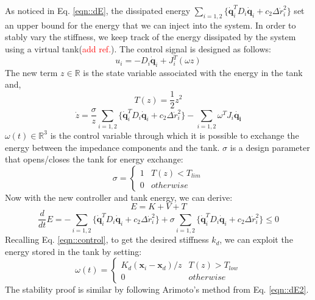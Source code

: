 \documentclass[]{article}
\begin{document}
As noticed in Eq. \ref{eqn::dE}, the dissipated energy $\sum\limits_{i=1,2}\{\mathbf{\dot{q}}_i^TD_i\mathbf{\dot{q}}_i+c_2\Delta \dot{r}_i^2\}$ set an upper bound for the energy that we can inject into the system. In order to stably vary the stiffness, we keep track of the energy dissipated by the system using a virtual tank(\textcolor{red}{add ref.}). The control signal is designed as follows:
\begin{equation}
u_i=-D_i\mathbf{\dot{q}}_i+J_i^T(\omega z)
\label{eqn::new_control}
\end{equation} 
The new term $z\in \mathbb{R}$ is the state variable associated with the energy in the tank and,
\begin{equation}
T(z)=\frac{1}{2}z^2
\end{equation}
\begin{equation}
\dot{z}=\frac{\sigma}{z}\sum\limits_{i=1,2}\{\mathbf{\dot{q}}_i^TD_i\mathbf{\dot{q}}_i+c_2\Delta \dot{r}_i^2\}-\sum\limits_{i=1,2}\omega^T J_i\mathbf{\dot{q_i}}
\end{equation}
$\omega(t)\in \mathbb{R}^3$ is the control variable through which it is possible to exchange the energy between the impedance components and the tank. $\sigma$ is a design parameter that opens/closes the tank for energy exchange:
\begin{displaymath}
\sigma = \left\{\begin{array}{ll}
1& T(z)<T_{lim}\\
0& otherwise
\end{array}\right.
\end{displaymath}
Now with the new controller and tank energy, we can derive:
\begin{equation}
E=K+V+T
\end{equation}
\begin{equation}
\frac{d}{dt}E=-\sum\limits_{i=1,2}\{\mathbf{\dot{q}}_i^TD_i\mathbf{\dot{q}}_i+c_2\Delta \dot{r}_i^2\}+\sigma\sum\limits_{i=1,2}\{\mathbf{\dot{q}}_i^TD_i\mathbf{\dot{q}}_i+c_2\Delta \dot{r}_i^2\}\leq0
\label{eqn::dE2}
\end{equation}
Recalling Eq. \ref{eqn::control}, to get the desired stiffness $k_d$, we can exploit the energy stored in the tank by setting:
\begin{displaymath}
\omega(t)=\left\{\begin{array}{ll}
K_d(\mathbf{x}_i-\mathbf{x}_d)/z & T(z)>T_{low}\\
0&otherwise
\end{array}\right.
\end{displaymath}
The stability proof is similar by following Arimoto's method from Eq. \ref{eqn::dE2}.
\end{document}

